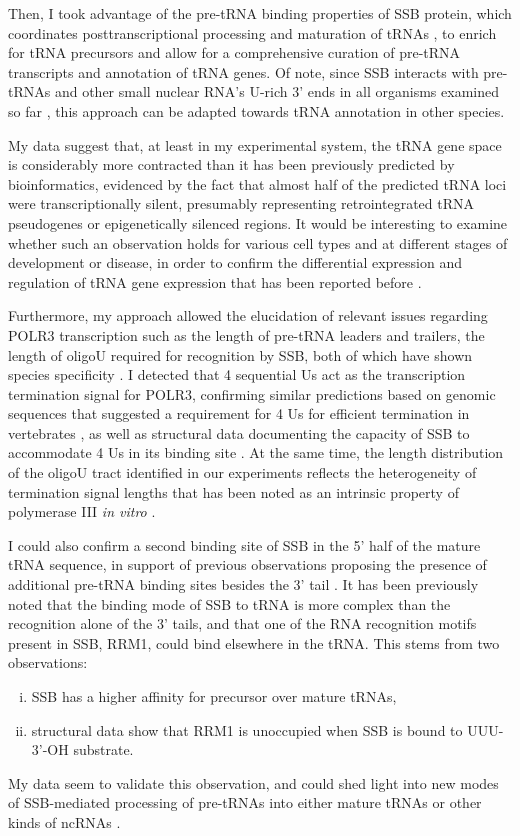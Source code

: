 \documentclass[12pt]{rockefeller}
\begin{document}
Then, I took advantage of the pre-tRNA binding properties of SSB protein, which coordinates posttranscriptional processing and maturation of tRNAs \cite{Maraia:2010kx}, to enrich for tRNA precursors and allow for a comprehensive curation of pre-tRNA transcripts and annotation of tRNA genes. Of note, since SSB interacts with pre-tRNAs and other small nuclear RNA's U-rich 3’ ends in all organisms examined so far \cite{Maraia:2006in,Teplova:2006dv}, this approach can be adapted towards tRNA annotation in other species.

My data suggest that, at least in my experimental system, the tRNA gene space is considerably more contracted than it has been previously predicted by bioinformatics, evidenced by the fact that almost half of the predicted tRNA loci were transcriptionally silent, presumably representing retrointegrated tRNA pseudogenes or epigenetically silenced regions. It would be interesting to examine whether such an observation holds for various cell types and at different stages of development or disease, in order to confirm the differential expression and regulation of tRNA gene expression that has been reported before \cite{Gingold:2014iz,Goodarzi:2016gd}. 

Furthermore, my approach allowed the elucidation of relevant issues regarding POLR3 transcription such as the length of pre-tRNA leaders and trailers, the length of oligoU required for recognition by SSB, both of which have shown species specificity \cite{Arimbasseri:2015jg}. I detected that 4 sequential Us act as the transcription termination signal for POLR3, confirming similar predictions based on genomic sequences that suggested a requirement for 4 Us for efficient termination in vertebrates \cite{Arimbasseri:2013by,Iben:2012cy}, as well as structural data documenting the capacity of SSB to accommodate 4 Us in its binding site \cite{Stefano:1984wp,Teplova:2006dv}. At the same time, the length distribution of the oligoU tract identified in our experiments reflects the heterogeneity of termination signal lengths that has been noted as an intrinsic property of polymerase III \textit{in vitro} \cite{Arimbasseri:2015jg}.

I could also confirm a second binding site of SSB in the 5’ half of the mature tRNA sequence, in support of previous observations proposing the presence of additional pre-tRNA binding sites besides the 3’ tail \cite{Bayfield:2009cx,Stefano:1984wp}. It has been previously noted that the binding mode of SSB to tRNA is more complex than the recognition alone of the 3’ tails, and that one of the RNA recognition motifs present in SSB, RRM1, could bind elsewhere in the tRNA. This stems from two observations:
\begin{enumerate}[i)]
\item SSB has a higher affinity for precursor over mature tRNAs, 
\item structural data show that RRM1 is unoccupied when SSB is bound to UUU-3’-OH substrate.
\end{enumerate}
My data seem to validate this observation, and could shed light into new modes of SSB-mediated processing of pre-tRNAs into either mature tRNAs or other kinds of ncRNAs \cite{Hasler:2016ce}. 
\end{document}
